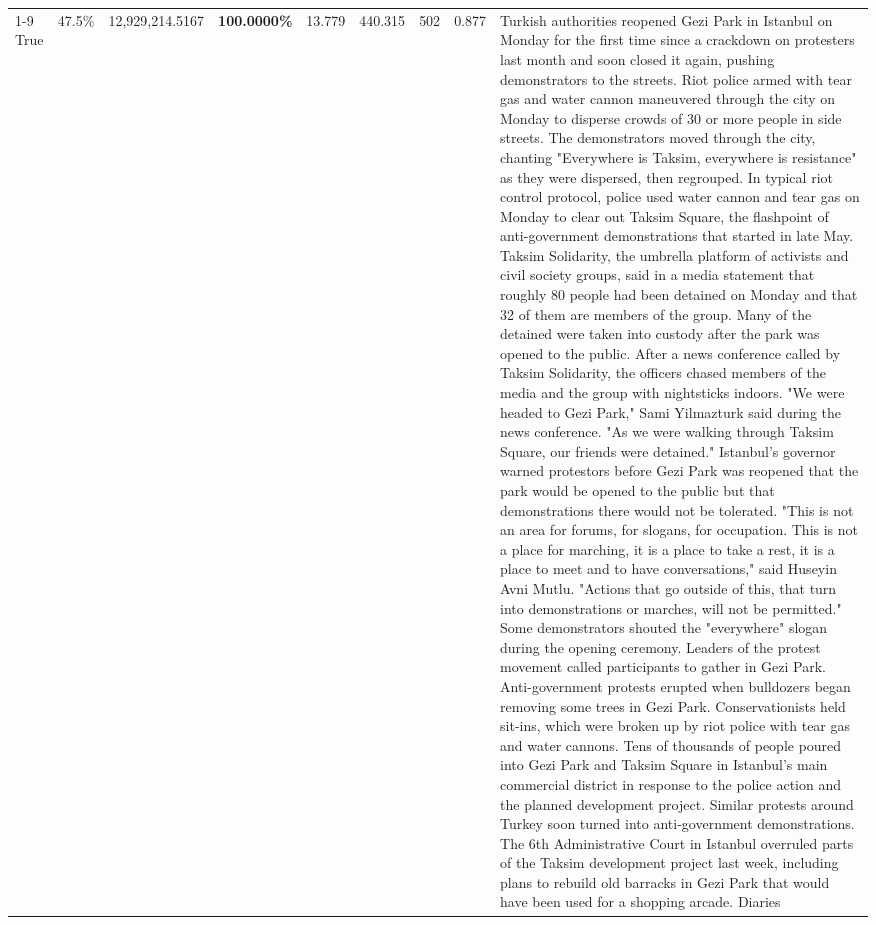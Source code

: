 \begin{table}[H]
\begin{tabular}{lllrlllll}
\cline{1-9}
True & 47.5\% & 12,929,214.5167 & \bfseries \color{red} 100.0000\% & 13.779 & 440.315 & 502 & 0.877 & Turkish authorities reopened Gezi Park in Istanbul on Monday for the first time since a crackdown on protesters last month and soon closed it again, pushing demonstrators to the streets. Riot police armed with tear gas and water cannon maneuvered through the city on Monday to disperse crowds of 30 or more people in side streets. The demonstrators moved through the city, chanting "Everywhere is Taksim, everywhere is resistance" as they were dispersed, then regrouped. In typical riot control protocol, police used water cannon and tear gas on Monday to clear out Taksim Square, the flashpoint of anti-government demonstrations that started in late May. Taksim Solidarity, the umbrella platform of activists and civil society groups, said in a media statement that roughly 80 people had been detained on Monday and that 32 of them are members of the group. Many of the detained were taken into custody after the park was opened to the public. After a news conference called by Taksim Solidarity, the officers chased members of the media and the group with nightsticks indoors. "We were headed to Gezi Park," Sami Yilmazturk said during the news conference. "As we were walking through Taksim Square, our friends were detained." Istanbul's governor warned protestors before Gezi Park was reopened that the park would be opened to the public but that demonstrations there would not be tolerated. "This is not an area for forums, for slogans, for occupation. This is not a place for marching, it is a place to take a rest, it is a place to meet and to have conversations," said Huseyin Avni Mutlu. "Actions that go outside of this, that turn into demonstrations or marches, will not be permitted." Some demonstrators shouted the "everywhere" slogan during the opening ceremony. Leaders of the protest movement called participants to gather in Gezi Park. Anti-government protests erupted when bulldozers began removing some trees in Gezi Park. Conservationists held sit-ins, which were broken up by riot police with tear gas and water cannons. Tens of thousands of people poured into Gezi Park and Taksim Square in Istanbul's main commercial district in response to the police action and the planned development project. Similar protests around Turkey soon turned into anti-government demonstrations. The 6th Administrative Court in Istanbul overruled parts of the Taksim development project last week, including plans to rebuild old barracks in Gezi Park that would have been used for a shopping arcade. Diaries \\

\end{tabular}
\end{table}
